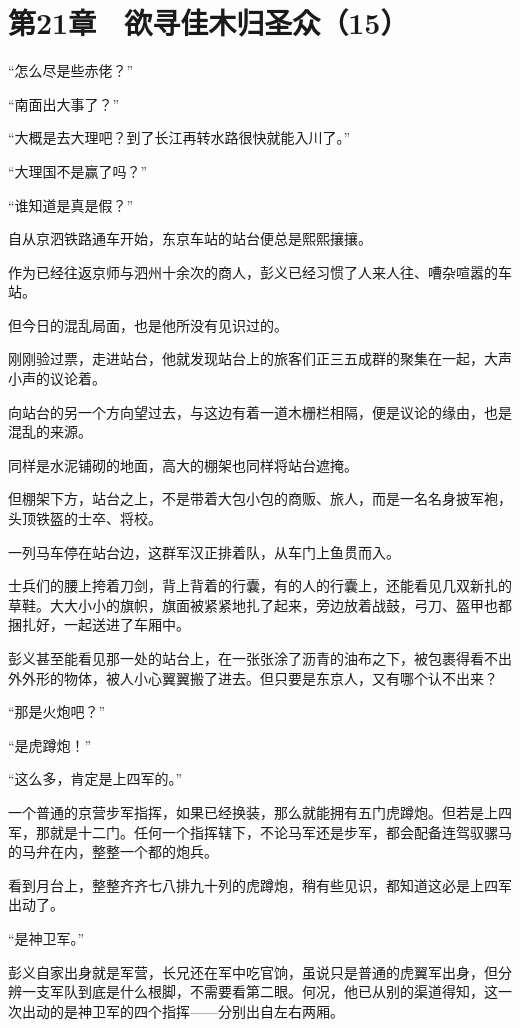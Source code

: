 \section{第21章　欲寻佳木归圣众（15）}

“怎么尽是些赤佬？”

“南面出大事了？”

“大概是去大理吧？到了长江再转水路很快就能入川了。”

“大理国不是赢了吗？”

“谁知道是真是假？”

自从京泗铁路通车开始，东京车站的站台便总是熙熙攘攘。

作为已经往返京师与泗州十余次的商人，彭义已经习惯了人来人往、嘈杂喧嚣的车站。

但今日的混乱局面，也是他所没有见识过的。

刚刚验过票，走进站台，他就发现站台上的旅客们正三五成群的聚集在一起，大声小声的议论着。

向站台的另一个方向望过去，与这边有着一道木栅栏相隔，便是议论的缘由，也是混乱的来源。

同样是水泥铺砌的地面，高大的棚架也同样将站台遮掩。

但棚架下方，站台之上，不是带着大包小包的商贩、旅人，而是一名名身披军袍，头顶铁盔的士卒、将校。

一列马车停在站台边，这群军汉正排着队，从车门上鱼贯而入。

士兵们的腰上挎着刀剑，背上背着的行囊，有的人的行囊上，还能看见几双新扎的草鞋。大大小小的旗帜，旗面被紧紧地扎了起来，旁边放着战鼓，弓刀、盔甲也都捆扎好，一起送进了车厢中。

彭义甚至能看见那一处的站台上，在一张张涂了沥青的油布之下，被包裹得看不出外外形的物体，被人小心翼翼搬了进去。但只要是东京人，又有哪个认不出来？

“那是火炮吧？”

“是虎蹲炮！”

“这么多，肯定是上四军的。”

一个普通的京营步军指挥，如果已经换装，那么就能拥有五门虎蹲炮。但若是上四军，那就是十二门。任何一个指挥辖下，不论马军还是步军，都会配备连驾驭骡马的马弁在内，整整一个都的炮兵。

看到月台上，整整齐齐七八排九十列的虎蹲炮，稍有些见识，都知道这必是上四军出动了。

“是神卫军。”

彭义自家出身就是军营，长兄还在军中吃官饷，虽说只是普通的虎翼军出身，但分辨一支军队到底是什么根脚，不需要看第二眼。何况，他已从别的渠道得知，这一次出动的是神卫军的四个指挥——分别出自左右两厢。

